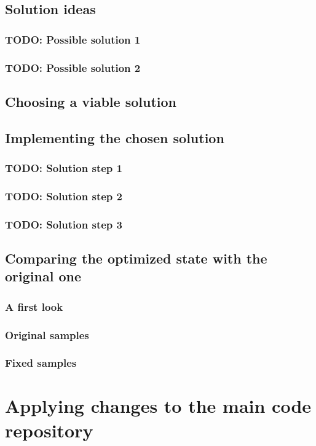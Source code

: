 \documentclass[11pt,a4paper,oneside]{report}
\begin{document}
\section{Solution ideas}
\subsection{TODO: Possible solution 1}
\subsection{TODO: Possible solution 2}
\section{Choosing a viable solution}
\section{Implementing the chosen solution}
\subsection{TODO: Solution step 1}
\subsection{TODO: Solution step 2}
\subsection{TODO: Solution step 3}
\section{Comparing the optimized state with the original one}
\subsection{A first look}
\subsection{Original samples}
\subsection{Fixed samples}

\chapter{Applying changes to the main code repository}
\end{document}
